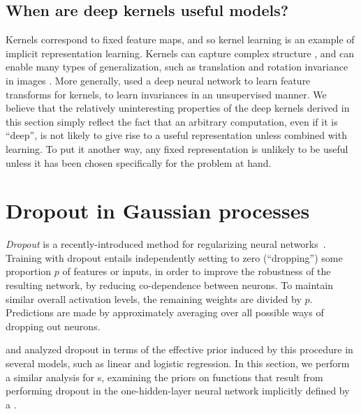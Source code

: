 \documentclass{article} %
\begin{document}
\subsection{When are deep kernels useful models?}

Kernels correspond to fixed feature maps, and so kernel learning is an example of implicit representation learning. %
Kernels can capture complex structure \citep{DuvLloGroetal13}, and can enable many types of generalization, such as translation and rotation invariance in images \citep{kondor2008group}.
More generally, \cite{salakhutdinov2008using} used a deep neural network to learn feature transforms for kernels, to learn invariances in an unsupervised manner.
We believe that the relatively uninteresting properties of the deep kernels derived in this section simply reflect the fact that an arbitrary computation, even if it is ``deep'', is not likely to give rise to a useful representation unless combined with learning.
To put it another way, any fixed representation is unlikely to be useful unless it has been chosen specifically for the problem at hand.





\section{Dropout in Gaussian processes}
\label{sec:dropout-gps}

\emph{Dropout} is a recently-introduced method for regularizing neural networks~\citep{hinton2012improving, srivastava2013improving}.
Training with dropout entails independently setting to zero (``dropping'') some proportion $p$ of features or inputs, in order to improve the robustness of the resulting network, by reducing co-dependence between neurons.
To maintain similar overall activation levels, the remaining weights are divided by $p$.
Predictions are made by approximately averaging over all possible ways of dropping out neurons.

\citet{baldi2013understanding} and \citet{wang2013fast} analyzed dropout in terms of the effective prior induced by this procedure in several models, such as linear and logistic regression.
In this section, we perform a similar analysis for \gp{}s, examining the priors on functions that result from performing dropout in the one-hidden-layer neural network implicitly defined by a \gp{}.
\end{document}
